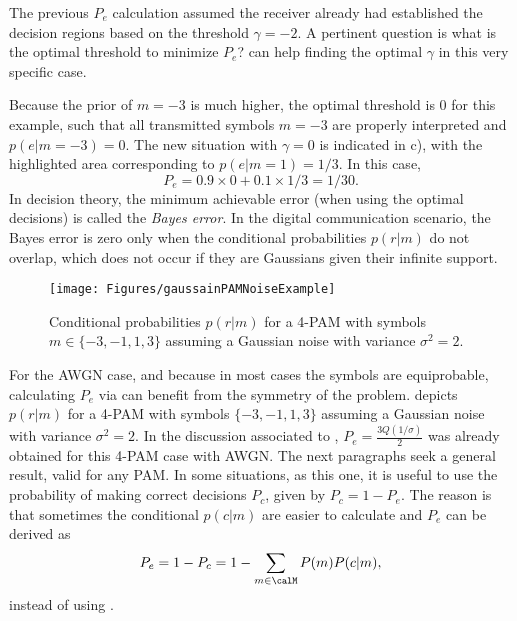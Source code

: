 The previous $P_e$ calculation assumed the receiver already had established the decision regions based on the threshold $\gamma = -2$. A pertinent question is what is the optimal threshold to minimize $P_e$? 
 can help finding the optimal $\gamma$ in this very specific case.

Because the prior of $m=-3$ is much higher, the optimal threshold is 0 for this example, such that all transmitted symbols $m=-3$ are properly interpreted and $p(e|m=-3)=0$. The new situation with $\gamma = 0$ is indicated in  c), with the highlighted area corresponding to $p(e|m=1)=1/3$. In this case,
\[
P_e = 0.9 \times 0 + 0.1 \times 1/3 = 1/30.
\]
In decision theory, the minimum achievable error (when using the optimal decisions) is called the \emph{Bayes error}. In the digital communication scenario, the Bayes error is zero only when the conditional probabilities $p(r|m)$ do not overlap, which does not occur if they are Gaussians given their infinite support.

\begin{figure}[htbp]
\centering
\texttt{[image: Figures/gaussainPAMNoiseExample]}
\caption{Conditional probabilities $p(r|m)$ for a 4-PAM with symbols $m \in \{-3,-1,1,3\}$ assuming a Gaussian noise with variance $\sigma^2 = 2$.\label{fig:gaussainPAMNoiseExample}}
\end{figure}

For the AWGN case, and because in most cases the symbols are equiprobable, calculating $P_e$ via  can benefit from the symmetry of the problem.  depicts $p(r|m)$ for a 4-PAM with symbols $\{-3,-1,1,3\}$ assuming a Gaussian noise with variance $\sigma^2 = 2$. In the discussion associated to , $P_e = \frac{3Q(1/\sigma)}{2}$ was already obtained for this 4-PAM case with AWGN. The next paragraphs seek a general result, valid for any PAM. In some situations, as this one, it is useful to use the probability of making correct decisions $P_c$, given by $P_c = 1 - P_e$. The reason is that sometimes the conditional $p(c|m)$ are easier to calculate and $P_e$ can be derived as
\[
P_e = 1 - P_c = 1 - \sum_{m \in \calM} P(m) P(c|m),
\]
instead of using .

